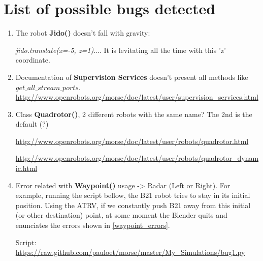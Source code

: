 \chapter*{List of possible bugs detected}

\begin{enumerate}
\item The robot \textbf{Jido()} doesn't fall with gravity:

\textit{jido.translate(x=-5, z=1)}.... It is levitating all the time with this 'z' coordinate.

\item Documentation of \textbf{Supervision Services} doesn't present all methods like \textit{$get\_all\_stream\_ports$}.
\url{http://www.openrobots.org/morse/doc/latest/user/supervision_services.html}

\item Class \textbf{Quadrotor()}, 2 different robots with the same name? The 2nd is the default (?)

\url{http://www.openrobots.org/morse/doc/latest/user/robots/quadrotor.html}

\url{http://www.openrobots.org/morse/doc/latest/user/robots/quadrotor_dynamic.html}

\item Error related with \textbf{Waypoint()} usage -> Radar (Left or Right). For example, running the script bellow, the B21 robot tries to stay in its initial position. Using the ATRV, if we constantly push B21 away from this initial (or other destination) point, at some moment the Blender quits and enunciates the errors shown in \ref{waypoint_errors}.

Script: \url{https://raw.github.com/pauloet/morse/master/My_Simulations/bug1.py}


\end{enumerate}
